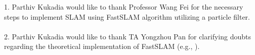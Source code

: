 1. Parthiv Kukadia would like to thank Professor Wang Fei for the necessary steps to implement SLAM using FastSLAM algorithm utilizing a particle filter.
\\
\\2. Parthiv Kukadia would like to thank TA Yongzhou Pan for clarifying doubts regarding the theoretical implementation of FastSLAM (e.g., ).\\